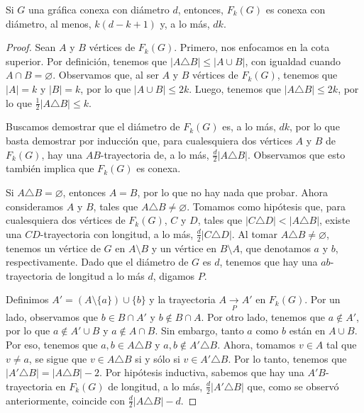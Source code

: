 \begin{teorema}%
\label{teo:diamFG}
    Si $G$ una gr\'afica conexa con di\'ametro $d$, entonces, $F_{k}(G)$ es
    conexa con di\'ametro, al menos, $k(d -k+1)$ y, a lo m\'as, $d k$.
\end{teorema}

\begin{proof}
    Sean $A$ y $B$ v\'ertices de $F_{k}(G)$. Primero, nos enfocamos en la cota
    superior. Por definici\'on, tenemos que $|A \triangle B| \leq |A \cup B|$,
    con igualdad cuando $A \cap B = \varnothing$. Observamos que, al ser $A$ y
    $B$ v\'ertices de $F_{k}(G)$, tenemos que $|A|=k$ y $|B|=k$, por lo que $|A
    \cup B| \le 2k$. Luego, tenemos que $|A \triangle B| \leq 2k$, por lo que
    $\frac{1}{2} |A \triangle B| \leq k$.

    Buscamos demostrar que el di\'ametro de $F_{k}(G)$ es, a lo m\'as, $d k$,
    por lo que basta demostrar por inducci\'on que, para cualesquiera dos
    v\'ertices $A$ y $B$ de $F_{k}(G)$, hay una $AB$-trayectoria de, a lo m\'as,
    $\frac{d}{2}|A\triangle B|$. Observamos que esto tambi\'en implica que
    $F_{k}(G)$ es conexa.

    Si $A\triangle B=\varnothing$, entonces $A=B$, por lo que no hay nada que
    probar. Ahora consideramos $A$ y $B$, tales que $A\triangle B \neq
    \varnothing$. Tomamos como hip\'otesis que, para cualesquiera dos v\'ertices
    de $F_{k}(G)$, $C$ y $D$, tales que $|C\triangle D|<|A \triangle B|$, existe
    una $CD$-trayectoria con longitud, a lo m\'as, $\frac{d}{2}|C\triangle D|$.
    Al tomar $A\triangle B \neq \varnothing$, tenemos un v\'ertice de $G$ en
    $A\setminus B$ y un v\'ertice en $B\setminus A$, que denotamos $a$ y $b$,
    respectivamente. Dado que el di\'ametro de $G$ es $d$, tenemos que hay una
    $ab$-trayectoria de longitud a lo m\'as $d$, digamos $P$.

    Definimos $A'=(A\setminus \{a\})\cup \{b\}$ y la trayectoria
    $A\xrightarrow[P]{} A'$ en $F_{k}(G)$. Por un lado, observamos que $b\in
    B\cap A'$ y $b\notin B\cap A$. Por otro lado, tenemos que $a \notin A'$, por
    lo que $a\notin A'\cup B$ y $a\notin A\cap B$. Sin embargo, tanto $a$ como
    $b$ est\'an en $A\cup B$. Por eso, tenemos que $a,b \in A\triangle B$ y $a,b
    \notin A'\triangle B$. Ahora, tomamos $v\in A$ tal que $v \neq a$, se sigue
    que $v \in A\triangle B$ si y s\'olo si $v\in A'\triangle B$. Por lo tanto,
    tenemos que $|A'\triangle B|=|A \triangle B|- 2$. Por hip\'otesis inductiva,
    sabemos que hay una $A'B$-trayectoria en $F_{k}(G)$ de longitud, a lo m\'as,
    $\frac{d}{2}|A'\triangle B|$ que, como se observ\'o anteriormente, coincide
    con $\frac{d}{2}|A\triangle B| - d$.


\end{proof}
